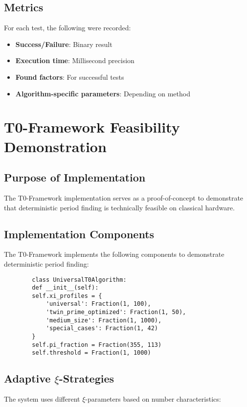 \documentclass[12pt,a4paper]{article}
\begin{document}
	\subsection{Metrics}
	
	For each test, the following were recorded:
	\begin{itemize}
		\item \textbf{Success/Failure}: Binary result
		\item \textbf{Execution time}: Millisecond precision
		\item \textbf{Found factors}: For successful tests
		\item \textbf{Algorithm-specific parameters}: Depending on method
	\end{itemize}
	
	\section{T0-Framework Feasibility Demonstration}
	
	\subsection{Purpose of Implementation}
	
	The T0-Framework implementation serves as a proof-of-concept to demonstrate that deterministic period finding is technically feasible on classical hardware.
	
	\subsection{Implementation Components}
	
	The T0-Framework implements the following components to demonstrate deterministic period finding:
	
	\begin{verbatim}
		class UniversalT0Algorithm:
		def __init__(self):
		self.xi_profiles = {
			'universal': Fraction(1, 100),
			'twin_prime_optimized': Fraction(1, 50),
			'medium_size': Fraction(1, 1000),
			'special_cases': Fraction(1, 42)
		}
		self.pi_fraction = Fraction(355, 113)
		self.threshold = Fraction(1, 1000)
	\end{verbatim}
	
	\subsection{Adaptive $\xi$-Strategies}
	
	The system uses different $\xi$-parameters based on number characteristics:
	
\end{document}
